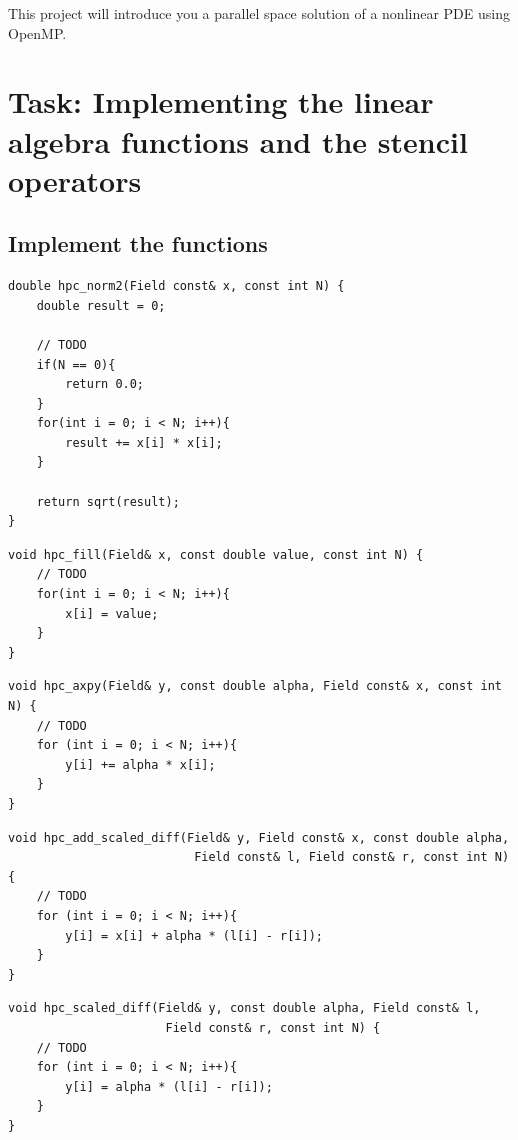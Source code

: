 \documentclass[unicode,11pt,a4paper,oneside,numbers=endperiod,openany]{scrartcl}
\begin{document}
\setassignment

\newline

\assignmentpolicy
This project will introduce you a parallel space solution of a nonlinear PDE using OpenMP.

\section{Task: Implementing the linear algebra functions and the stencil operators}
\subsection{Implement the functions }
\begin{lstlisting}[language=MyC++, style=mystyle, caption={HPC Norm Calculation}]
double hpc_norm2(Field const& x, const int N) {
    double result = 0;

    // TODO
    if(N == 0){
        return 0.0;
    }
    for(int i = 0; i < N; i++){
        result += x[i] * x[i];
    }

    return sqrt(result);
}
\end{lstlisting}
\begin{lstlisting}[language=MyC++, style=mystyle, caption={HPC Fill Function}]
void hpc_fill(Field& x, const double value, const int N) {
    // TODO
    for(int i = 0; i < N; i++){
        x[i] = value;
    }
}
\end{lstlisting}
\begin{lstlisting}[language=MyC++, style=mystyle, caption={HPC AXPY Function}]
void hpc_axpy(Field& y, const double alpha, Field const& x, const int N) {
    // TODO
    for (int i = 0; i < N; i++){
        y[i] += alpha * x[i]; 
    }
}
\end{lstlisting}
\begin{lstlisting}[language=MyC++, style=mystyle, caption={HPC Add Scaled Difference Function}]
void hpc_add_scaled_diff(Field& y, Field const& x, const double alpha,
                          Field const& l, Field const& r, const int N) {
    // TODO
    for (int i = 0; i < N; i++){
        y[i] = x[i] + alpha * (l[i] - r[i]);
    }
}
\end{lstlisting}
\begin{lstlisting}[language=MyC++, style=mystyle, caption={HPC Scaled Difference Function}]
void hpc_scaled_diff(Field& y, const double alpha, Field const& l,
                      Field const& r, const int N) {
    // TODO
    for (int i = 0; i < N; i++){
        y[i] = alpha * (l[i] - r[i]);
    }
}
\end{lstlisting}
\end{document}
